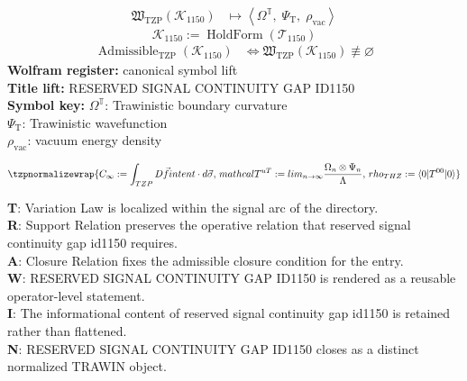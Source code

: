 \noindent
\begin{minipage}[t]{0.48\linewidth}
\begingroup
\small
\[
\begin{aligned}
\mathfrak{W}_{\mathrm{TZP}}\!\left(\mathcal{K}_{1150}\right)
&\longmapsto
\left\langle \Omega^{\mathbb{T}},\; \Psi_{\mathrm{T}},\; \rho_{\mathrm{vac}} \right\rangle
\end{aligned}
\]
\[
\mathcal{K}_{1150}
:=
\operatorname{HoldForm}\!\left(\mathcal{T}_{1150}\right)
\]
\[
\begin{aligned}
\operatorname{Admissible}_{\mathrm{TZP}}\!\left(\mathcal{K}_{1150}\right)
&\Longleftrightarrow
\mathfrak{W}_{\mathrm{TZP}}\!\left(\mathcal{K}_{1150}\right)\not\equiv\varnothing
\end{aligned}
\]
\textbf{Wolfram register:} canonical symbol lift\\
\textbf{Title lift:} RESERVED SIGNAL CONTINUITY GAP ID1150\\
\textbf{Symbol key:} \(\Omega^{\mathbb{T}}\): Trawinistic boundary curvature\\ \(\Psi_{\mathrm{T}}\): Trawinistic wavefunction\\ \(\rho_{\mathrm{vac}}\): vacuum energy density
\par
\endgroup
\end{minipage}\hfill
\begin{minipage}[t]{0.48\linewidth}
\[
\tzpnormalizewrap{C_{\infty} := \int_{TZP} D \vec{f} {intent} \cdot d\vec{\sigma},\,mathcal{T}^{uT}:=lim_{n\rightarrow\infty}\frac{\Omega_{n}\otimes\Psi_{n}}{\Lambda},\,rho_{THZ}:=\langle0|T^{00}|0\rangle}
\]

\small
\textbf{T}: Variation Law is localized within the signal arc of the directory.\\
\textbf{R}: Support Relation preserves the operative relation that reserved signal continuity gap id1150 requires.\\
\textbf{A}: Closure Relation fixes the admissible closure condition for the entry.\\
\textbf{W}: RESERVED SIGNAL CONTINUITY GAP ID1150 is rendered as a reusable operator-level statement.\\
\textbf{I}: The informational content of reserved signal continuity gap id1150 is retained rather than flattened.\\
\textbf{N}: RESERVED SIGNAL CONTINUITY GAP ID1150 closes as a distinct normalized TRAWIN object.
\normalsize
\end{minipage}

